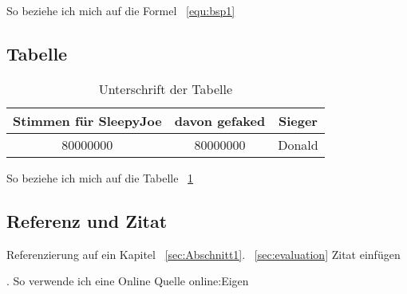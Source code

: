 So beziehe ich mich auf die Formel ~\ref{equ:bsp1}


\subsection{Tabelle}
\label{subsec:table}


\begin{table}[htb]
	\begin{center}
		\begin{tabular}[h]{c|c|c}	
			
			Stimmen für SleepyJoe & davon gefaked  & Sieger \\
			\hline
			80000000 & 80000000 & Donald \\
			\hline
		\end{tabular}
		\caption{Unterschrift  der Tabelle}
		\label{tab:Tabelle1}
	\end{center}
\end{table}

So beziehe ich mich auf die Tabelle ~\ref{tab:Tabelle1}


\subsection{Referenz und Zitat}
\label{subsec:refcite}
Referenzierung auf ein Kapitel ~\ref{sec:Abschnitt1}. ~\ref{sec:evaluation}
Zitat einfügen

\cite{stinyAktiveElektronischeBauelemente2019}.
\cite{aasdBlabla2021}
So verwende ich eine Online Quelle \gls{online:Eigen}
